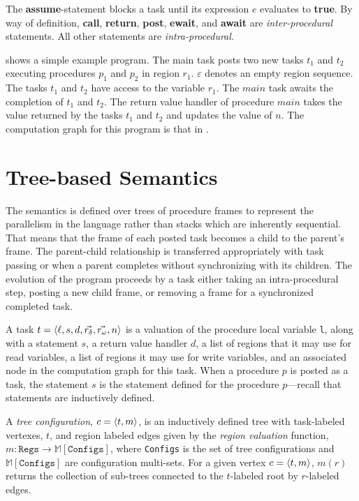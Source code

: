 The \textbf{assume}-statement blocks a task until its expression $e$ evaluates to \textbf{true}. By way of definition, \textbf{call}, \textbf{return}, \textbf{post}, \textbf{ewait}, and \textbf{await} are \emph{inter-procedural} statements. All other statements are \emph{intra-procedural}.

 shows a simple example program. The main task posts two new tasks $t_1$ and $t_2$ executing procedures $p_1$ and $p_2$ in region $r_1$. $\varepsilon$ denotes an empty region sequence. The tasks $t_1$ and $t_2$ have access to the variable $r_1$. The $main$ task awaits the completion of $t_1$ and $t_2$. The return value handler of procedure $main$ takes the value returned by the tasks $t_1$ and $t_2$ and updates the value of $n$. The computation graph for this program is that in .

\section{Tree-based Semantics}

The semantics is defined over trees of procedure frames to represent the parallelism in the language rather than stacks which are inherently sequential. That means that the frame of each posted task becomes a child to the parent's frame. The parent-child relationship is transferred appropriately with task passing or when a parent completes without synchronizing with its children. The evolution of the program proceeds by a task either taking an intra-procedural step, posting a new child frame, or removing a frame for a synchronized completed task.

A task $t = \langle \ell, s, d, \vec{r_\delta}, \vec{r_\omega}, n \rangle $ is a valuation of the procedure local variable \texttt{l}, along with a statement $s$, a return value handler $d$, a list of regions that it may use for read variables, a list of regions it may use for write variables, and an associated node in the computation graph for this task. When a procedure $p$ is posted as a task, the statement $s$ is the statement defined for the procedure $p$---recall that statements are inductively defined. 

A \emph{tree configuration}, $c = \langle t,m \rangle $, is an inductively defined tree with task-labeled vertexes, $t$, and region labeled edges given by the \emph{region valuation} function, $m : \texttt{Regs} \rightarrow \mathbb{M}[\texttt{Configs}]$, where \texttt{Configs} is the set of tree configurations and $\mathbb{M}[\texttt{Configs}]$ are configuration multi-sets. For a given vertex $c = \langle t,m \rangle $, $m(r)$ returns the collection of sub-trees connected to the $t$-labeled root by $r$-labeled edges.

